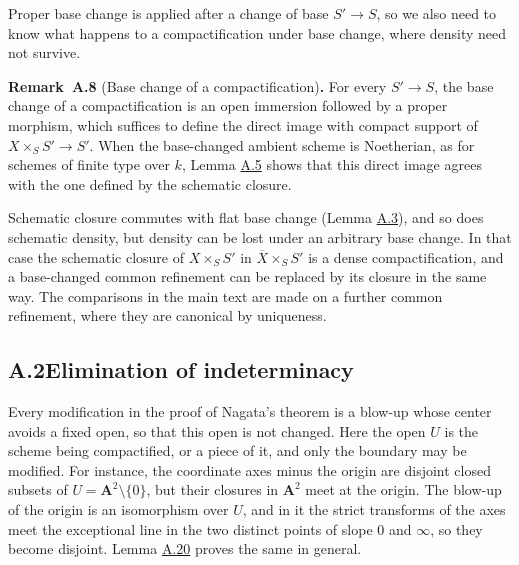 \documentclass[11pt]{article}
\newenvironment{bpstatement}[2]{\par\addvspace{0.6\baselineskip}\noindent\textbf{#1}#2\textbf{.}\enspace\ignorespaces}
  {\par\addvspace{0.4\baselineskip}}
\begin{document}
\label{bp23}%
Proper base change is applied after a change of base \(S'\to S\), so we also need to know what happens to a compactification under base change, where density need not survive.

\label{bp24}%
\begin{bpstatement}{Remark~A.8}{ (Base change of a compactification)}
For every \(S'\to S\), the base change of a compactification is an open immersion followed by a proper morphism, which suffices to define the direct image with compact support of \(X\times_SS'\to S'\). When the base-changed ambient scheme is Noetherian, as for schemes of finite type over \(k\), Lemma \hyperref[bp17]{A.5} shows that this direct image agrees with the one defined by the schematic closure.

Schematic closure commutes with flat base change (Lemma \hyperref[bp11]{A.3}), and so does schematic density, but density can be lost under an arbitrary base change. In that case the schematic closure of \(X\times_SS'\) in \(\overline X\times_SS'\) is a dense compactification, and a base-changed common refinement can be replaced by its closure in the same way. The comparisons in the main text are made on a further common refinement, where they are canonical by uniqueness.
\end{bpstatement}


\subsection*{\texorpdfstring{A.2\quad Elimination of indeterminacy}{A.2 Elimination of indeterminacy}}
\label{bp25}%
\label{bp26}%
Every modification in the proof of Nagata's theorem is a blow-up whose center avoids a fixed open, so that this open is not changed. Here the open \(U\) is the scheme being compactified, or a piece of it, and only the boundary may be modified. For instance, the coordinate axes minus the origin are disjoint closed subsets of \(U=\mathbf A^2\setminus\{0\}\), but their closures in \(\mathbf A^2\) meet at the origin. The blow-up of the origin is an isomorphism over \(U\), and in it the strict transforms of the axes meet the exceptional line in the two distinct points of slope \(0\) and \(\infty\), so they become disjoint. Lemma \hyperref[bp55]{A.20} proves the same in general.
\end{document}
